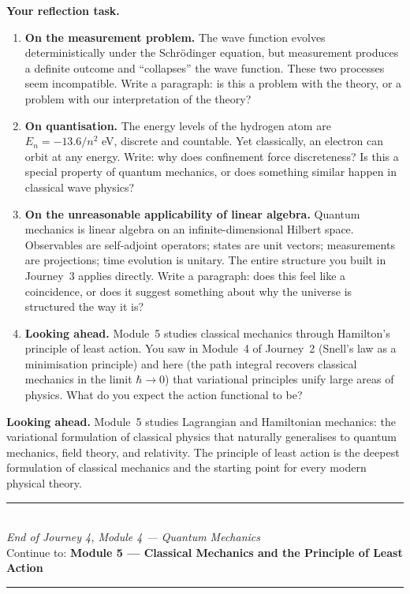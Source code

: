 \documentclass[12pt,a4paper]{article}
\newcounter{problem}
\begin{document}
\begin{reflectionbox}
\textbf{Your reflection task.}

\begin{enumerate}
  \item \textbf{On the measurement problem.} The wave function evolves deterministically under the Schr\"{o}dinger equation, but measurement produces a definite outcome and ``collapses'' the wave function. These two processes seem incompatible. Write a paragraph: is this a problem with the theory, or a problem with our interpretation of the theory?

  \item \textbf{On quantisation.} The energy levels of the hydrogen atom are $E_n=-13.6/n^2$ eV, discrete and countable. Yet classically, an electron can orbit at any energy. Write: why does confinement force discreteness? Is this a special property of quantum mechanics, or does something similar happen in classical wave physics?

  \item \textbf{On the unreasonable applicability of linear algebra.} Quantum mechanics is linear algebra on an infinite-dimensional Hilbert space. Observables are self-adjoint operators; states are unit vectors; measurements are projections; time evolution is unitary. The entire structure you built in Journey~3 applies directly. Write a paragraph: does this feel like a coincidence, or does it suggest something about why the universe is structured the way it is?

  \item \textbf{Looking ahead.} Module~5 studies classical mechanics through Hamilton's principle of least action. You saw in Module~4 of Journey~2 (Snell's law as a minimisation principle) and here (the path integral recovers classical mechanics in the limit $\hbar\to 0$) that variational principles unify large areas of physics. What do you expect the action functional to be?
\end{enumerate}
\end{reflectionbox}

\medskip
\noindent\textbf{Looking ahead.}
Module~5 studies Lagrangian and Hamiltonian mechanics: the variational formulation of classical physics that naturally generalises to quantum mechanics, field theory, and relativity. The principle of least action is the deepest formulation of classical mechanics and the starting point for every modern physical theory.

\vspace{1.4cm}
\begin{center}
{\color{MidBlue}\rule{0.5\linewidth}{0.8pt}}\\[6pt]
{\small\color{DarkGrey}\textit{End of Journey 4, Module 4 --- Quantum Mechanics}}\\[4pt]
{\small\color{DarkGrey}Continue to: \textbf{Module 5 --- Classical Mechanics and the Principle of Least Action}}\\[6pt]
{\color{MidBlue}\rule{0.5\linewidth}{0.8pt}}
\end{center}
\end{document}
